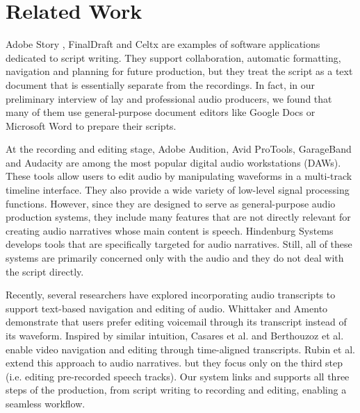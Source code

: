 \section{Related Work}

Adobe Story \cite{adobestory2016}, FinalDraft and Celtx are examples of software applications dedicated to script writing. They support collaboration, automatic formatting, navigation and planning for future production, but they treat the script as a text document that is essentially separate from the recordings. In fact, in our preliminary interview of lay and professional audio producers, we found that many of them use general-purpose document editors like Google Docs or Microsoft Word to prepare their scripts.

At the recording and editing stage, Adobe Audition, Avid ProTools, GarageBand and Audacity are among the most popular digital audio workstations (DAWs). These tools allow users to edit audio by manipulating waveforms in a multi-track timeline interface. They also provide a wide variety of low-level signal processing functions. However, since they are designed to serve as general-purpose audio production systems, they include many features that are not directly relevant for creating audio narratives whose main content is speech. Hindenburg Systems develops tools that are specifically targeted for audio narratives. Still, all of these systems are primarily concerned only with the audio and they do not deal with the script directly.   

Recently, several researchers have explored incorporating audio transcripts to support text-based navigation and editing of audio. Whittaker and Amento \cite{whittaker2004semantic} demonstrate that users prefer editing voicemail through its transcript instead of its waveform. Inspired by similar intuition, Casares et al. \cite{casares2002simplifying} and Berthouzoz et al. \cite{berthouzoz2012tools} enable video navigation and editing through time-aligned transcripts. Rubin et al. \cite{rubin2013content} extend this approach to audio narratives. but they focus only on the third step (i.e. editing pre-recorded speech tracks). Our system links and supports all three steps of the production, from script writing to recording and editing, enabling a seamless workflow.       


